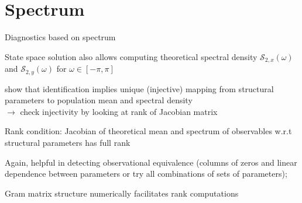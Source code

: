 \documentclass[handout,usepdftitle=false,xcolor=dvipsnames,aspectratio=169]{beamer}
\begin{document}
\section{Spectrum}

\begin{frame}{Diagnostics based on spectrum}

  \begin{witemize}
    \item State space solution also allows computing theoretical spectral density $\mathcal{S}_{2,x}(\omega)$ and $\mathcal{S}_{2,y}(\omega)$ for $\omega \in [-\pi,\pi]$
    \item \textcite{QuTkachenko2012} show that identification implies unique (injective) mapping from structural parameters to population mean and spectral density\\
    $\rightarrow$ check injectivity by looking at rank of Jacobian matrix
    \item Rank condition: Jacobian of theoretical mean and spectrum of observables w.r.t structural parameters has full rank
    \item Again, helpful in detecting observational equivalence (columns of zeros and linear dependence between parameters or try all combinations of sets of parameters);
    \item Gram matrix structure numerically facilitates rank computations
  \end{witemize}
\end{frame}

%
\end{document}
